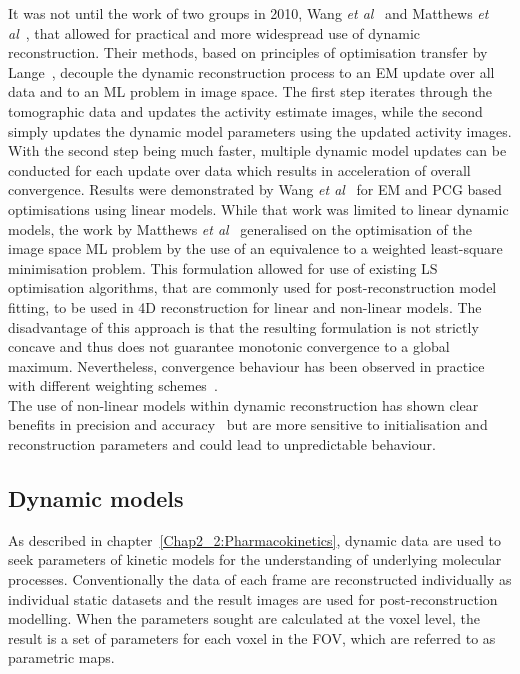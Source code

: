 It was not until the work of two groups in 2010, Wang \textit{et al}~\cite{Wang2010} and Matthews \textit{et al}~\cite{Matthews2010}, that allowed for practical and more widespread use of dynamic reconstruction. Their methods, based on principles of optimisation transfer by Lange~\cite{Lange2000}, decouple the dynamic reconstruction process to an EM update over all data and to an ML problem in image space. The first step iterates through the tomographic data and updates the activity estimate images, while the second simply updates the dynamic model parameters using the updated activity images. With the second step being much faster, multiple dynamic model updates can be conducted for each update over data which results in acceleration of overall convergence. Results were demonstrated by Wang \textit{et al}~\cite{Wang2010} for EM and PCG based optimisations using linear models. While that work was limited to linear dynamic models, the work by Matthews \textit{et al}~\cite{Matthews2010} generalised on the optimisation of the image space ML problem by the use of an equivalence to a weighted least-square minimisation problem. This formulation allowed for use of existing LS optimisation algorithms, that are commonly used for post-reconstruction model fitting, to be used in 4D reconstruction for linear and non-linear models. The disadvantage of this approach is that the resulting formulation is not strictly concave and thus does not guarantee monotonic convergence to a global maximum. Nevertheless, convergence behaviour has been observed in practice with different weighting schemes~\cite{Gravel2015,Wang2013}. \\
The use of non-linear models within dynamic reconstruction has shown clear benefits in precision and accuracy~\cite{Angelis2014,Kotasidis2012,Gravel2015} but are more sensitive to initialisation and reconstruction parameters and could lead to unpredictable behaviour.

\subsection{Dynamic models}
As described in chapter~\ref{Chap2_2:Pharmacokinetics}, dynamic data are used to seek parameters of kinetic models for the understanding of underlying molecular processes. Conventionally the data of each frame are reconstructed individually as individual static datasets and the result images are used for post-reconstruction modelling. When the parameters sought are calculated at the voxel level, the result is a set of parameters for each voxel in the FOV, which are referred to as parametric maps.


